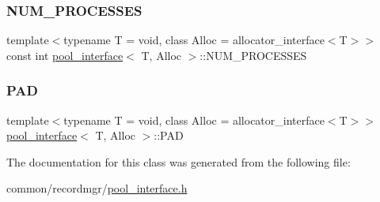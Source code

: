 \subsubsection{\texorpdfstring{N\+U\+M\+\_\+\+P\+R\+O\+C\+E\+S\+S\+ES}{NUM\_PROCESSES}}
{\footnotesize\ttfamily template$<$typename T  = void, class Alloc  = allocator\+\_\+interface$<$\+T$>$$>$ \\
const int \hyperlink{classpool__interface}{pool\+\_\+interface}$<$ T, Alloc $>$\+::N\+U\+M\+\_\+\+P\+R\+O\+C\+E\+S\+S\+ES}

\mbox{\label{classpool__interface_a1b714295ba794862f8a11cc5ec25cec7}} 
\subsubsection{\texorpdfstring{P\+AD}{PAD}}
{\footnotesize\ttfamily template$<$typename T  = void, class Alloc  = allocator\+\_\+interface$<$\+T$>$$>$ \\
\hyperlink{classpool__interface}{pool\+\_\+interface}$<$ T, Alloc $>$\+::P\+AD}



The documentation for this class was generated from the following file\+:\begin{DoxyCompactItemize}
\item 
common/recordmgr/\hyperlink{pool__interface_8h}{pool\+\_\+interface.\+h}\end{DoxyCompactItemize}
